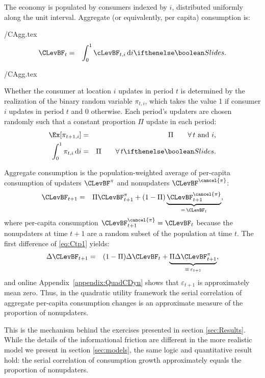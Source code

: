 The economy is populated by consumers indexed by $i$, distributed uniformly along the unit interval.  Aggregate (or equivalently, per capita) consumption is:
\begin{verbatimwrite}{\eq/CAgg.tex}
  \begin{eqnarray*}
    \CLevBF_{t} & = & \int_{0}^{1} \cLevBF_{t,i}\,\text{d}i
                      \ifslides{}{.}
  \end{eqnarray*}
\end{verbatimwrite}
 \eq/CAgg.tex

Whether the consumer at location $i$ updates in period $t$ is determined by the realization of the binary random variable $\pi_{t,i}$, which takes the value 1 if consumer $i$ updates in period $t$ and 0 otherwise.  Each period's updaters are chosen randomly such that a constant proportion $\Pi$ update in each period:
\begin{eqnarray*}
  \Ex[\pi_{t+1,i}] &= & \Pi \qquad \forall\,t \text{ and } i,
  \\ \int_{0}^{1} \pi_{t,i}\,\text{d}i & = & \Pi \qquad \forall\,t
                                             \ifslides{}{.}
\end{eqnarray*}

Aggregate consumption is the population-weighted average of per-capita consumption of updaters $\CLevBF^{\pi}$ and nonupdaters $\CLevBF^{\cancel{\pi}}$:
\begin{eqnarray}
  \CLevBF_{t+1} & = & \Pi \CLevBF^{{\pi}}_{t+1}+(1-\Pi) \underbrace{\CLevBF^{\cancel{{\pi}}}_{t+1}}_{=\,\CLevBF_{t}}, \label{eq:Ctp1}
\end{eqnarray}
where per-capita consumption $\CLevBF^{\cancel{{\pi}}}_{t+1}=\CLevBF_{t}$ because the
nonupdaters at time $t+1$ are a random subset of the population at time $t$.
The first difference of \eqref{eq:Ctp1} yields:
\begin{eqnarray*}
  \Delta \CLevBF_{t+1} & = &  (1-\Pi) \Delta \CLevBF_{t} + \underbrace{\Pi \Delta \CLevBF^{{\pi}}_{t+1}}_{\equiv\,\varepsilon_{t+1}}, \label{eq:deltac} \label{eq:dCQuadStickyApprox}
\end{eqnarray*}
and online Appendix~\ref{appendix:QuadCDyn} shows that $\varepsilon_{t+1}$ is approximately mean zero. Thus, in the quadratic utility framework the serial correlation of aggregate per-capita consumption changes is an approximate measure of the proportion of nonupdaters.

This is the mechanism behind the exercises presented in section \ref{sec:Results}.  While the details of the informational friction are different in the more realistic model we present in section \ref{sec:models}, the same logic and quantitative result hold: the serial correlation of consumption growth approximately equals the proportion of nonupdaters.

